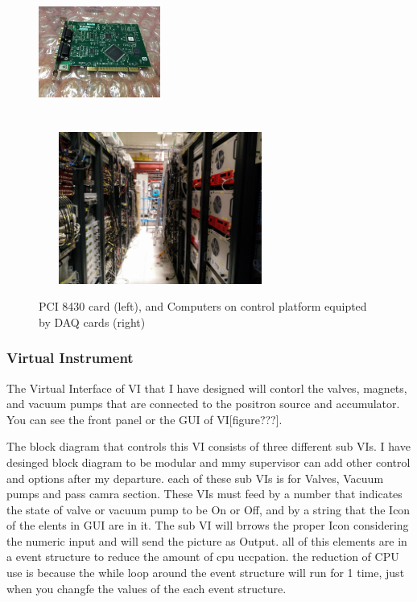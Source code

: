 \documentclass{article}
\begin{document}
\begin{figure}[h]
\centering
\includegraphics[width=40mm, height=50mm]{PCI_8430}
\includegraphics[width=80mm, height=50mm]{control_platform}
\caption{PCI 8430 card (left), and Computers on control platform equipted by DAQ cards (right) }
\end{figure}
	
\subsubsection{Virtual Instrument}

The Virtual Interface of VI that I have designed will contorl the valves, magnets, and vacuum pumps that are connected to the positron source and accumulator. You can see the front panel or the GUI of VI[figure???]. 

The block diagram that controls this VI consists of three different sub VIs. I have desinged  block diagram to be modular and mmy supervisor can add other control and options after my departure. each of these sub VIs is for Valves, Vacuum pumps and pass camra section. These VIs must feed by a number that indicates the state of valve or vacuum pump to be On or Off, and by a string that the Icon of the elents in GUI are in it. The sub VI will brrows the proper Icon considering the numeric input and will send the picture as Output. all of this elements are in a event structure to reduce the amount of cpu uccpation. the reduction of CPU use is because the while loop around the event structure will run for 1 time, just when you changfe the values of the each event structure.
\end{document}
